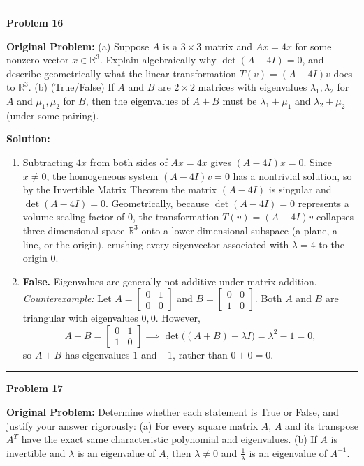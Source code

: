 \documentclass[11pt, letterpaper]{article}
\theoremstyle{definition}
\theoremstyle{remark}
\begin{document}
\noindent\rule{\textwidth}{0.4pt}

\noindent\textbf{Problem 16}

\textbf{Original Problem:} (a) Suppose $A$ is a $3 \times 3$ matrix and $Ax = 4x$ for some nonzero vector $x \in \mathbb{R}^3$. Explain algebraically why $\det(A - 4I) = 0$, and describe geometrically what the linear transformation $T(v) = (A - 4I)v$ does to $\mathbb{R}^3$. (b) (True/False) If $A$ and $B$ are $2 \times 2$ matrices with eigenvalues $\lambda_1, \lambda_2$ for $A$ and $\mu_1, \mu_2$ for $B$, then the eigenvalues of $A + B$ must be $\lambda_1 + \mu_1$ and $\lambda_2 + \mu_2$ (under some pairing).

\textbf{Solution:}
\begin{enumerate}[label=(\alph*), topsep=3pt, itemsep=4pt]
    \item Subtracting $4x$ from both sides of $Ax = 4x$ gives $(A - 4I)x = 0$. Since $x \neq 0$, the homogeneous system $(A - 4I)v = 0$ has a nontrivial solution, so by the Invertible Matrix Theorem the matrix $(A - 4I)$ is singular and $\det(A - 4I) = 0$. Geometrically, because $\det(A - 4I) = 0$ represents a volume scaling factor of $0$, the transformation $T(v) = (A - 4I)v$ collapses three-dimensional space $\mathbb{R}^3$ onto a lower-dimensional subspace (a plane, a line, or the origin), crushing every eigenvector associated with $\lambda = 4$ to the origin $0$.
    \item \textbf{False.} Eigenvalues are generally not additive under matrix addition. \textit{Counterexample:} Let $A = \begin{bmatrix} 0 & 1 \\ 0 & 0 \end{bmatrix}$ and $B = \begin{bmatrix} 0 & 0 \\ 1 & 0 \end{bmatrix}$. Both $A$ and $B$ are triangular with eigenvalues $0, 0$. However,
    \[
    A + B = \begin{bmatrix} 0 & 1 \\ 1 & 0 \end{bmatrix} \implies \det\big((A + B) - \lambda I\big) = \lambda^2 - 1 = 0,
    \]
    so $A + B$ has eigenvalues $1$ and $-1$, rather than $0 + 0 = 0$.
\end{enumerate}

\noindent\rule{\textwidth}{0.4pt}

\noindent\textbf{Problem 17}

\textbf{Original Problem:} Determine whether each statement is True or False, and justify your answer rigorously: (a) For every square matrix $A$, $A$ and its transpose $A^T$ have the exact same characteristic polynomial and eigenvalues. (b) If $A$ is invertible and $\lambda$ is an eigenvalue of $A$, then $\lambda \neq 0$ and $\frac{1}{\lambda}$ is an eigenvalue of $A^{-1}$.
\end{document}
